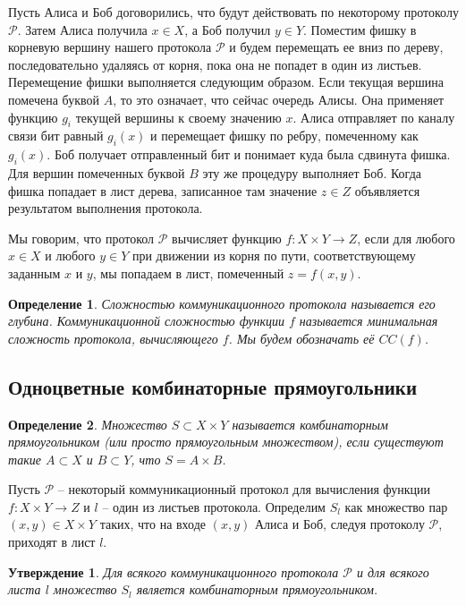 \documentclass[a4paper]{article}
\newtheorem*{mclaim}{Утверждение}
\newtheorem*{mdefinition}{Определение}
\begin{document}
Пусть Алиса и Боб договорились, что будут действовать по некоторому протоколу $\mathcal{P}$. Затем
Алиса получила $x\in X$, а Боб получил $y\in Y$. Поместим фишку в корневую вершину нашего протокола
$\mathcal{P}$ и будем перемещать ее вниз по дереву, последовательно удаляясь от корня,
пока она не попадет в один из листьев. Перемещение фишки выполняется следующим образом. Если текущая 
вершина помечена буквой $A$, то это означает, что сейчас очередь Алисы. Она применяет функцию $g_i$ текущей 
вершины к своему значению $x$. Алиса отправляет по каналу связи бит равный $g_i(x)$ и перемещает
фишку по ребру, помеченному как $g_i(x)$. Боб получает отправленный бит и понимает куда была сдвинута фишка.
Для вершин помеченных буквой $B$ эту же процедуру выполняет Боб. Когда фишка попадает в лист дерева,
записанное там значение $z\in Z$ объявляется результатом выполнения протокола.

Мы говорим, что протокол $\mathcal{P}$ вычисляет функцию $f:X\times Y \rightarrow Z$, если для любого
$x\in X$ и любого $y\in Y$ при движении из корня по пути, соответствующему заданным $x$ и $y$,
мы попадаем в лист, помеченный $z=f(x,y)$.

\begin{mdefinition}
	Сложностью коммуникационного протокола называется его глубина. Коммуникационной сложностью функции 
	$f$ называется минимальная сложность протокола, вычисляющего $f$. Мы будем обозначать её $CC(f)$.
\end{mdefinition}


\subsection{Одноцветные комбинаторные прямоугольники}
\begin{mdefinition}
	Множество $S \subset X\times Y$ называется комбинаторным прямоугольником (или просто прямоугольным
	множеством), если существуют такие $A \subset X$ и $B \subset Y$, что $S = A\times B$.
\end{mdefinition}

Пусть $\mathcal{P}$ -- некоторый коммуникационный протокол для вычисления функции $f:X\times Y \rightarrow Z$ 
и $l$ -- один из листьев протокола. Определим $S_l$ как множество пар $(x, y) \in X\times Y$ таких, что 
на входе $(x,y)$ Алиса и Боб, следуя протоколу $\mathcal{P}$, приходят в лист $l$.

\begin{mclaim}
    Для всякого коммуникационного протокола $\mathcal{P}$ и для всякого листа $l$ множество $S_l$
    является комбинаторным прямоугольником. 
\end{mclaim}
\end{document}
